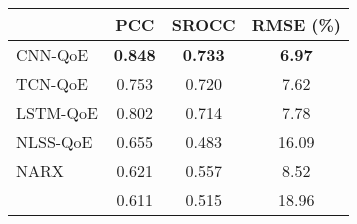 
  \begin{tabular}{|l|c|c|c|}
    \hline
    & PCC & SROCC & RMSE (\%)\\ \hline
    CNN-QoE & \textbf{0.848} & \textbf{0.733} & \textbf{6.97} \\ \hline
    TCN-QoE       & 0.753 & 0.720 & 7.62 \\ \hline
    LSTM-QoE \cite{QoEModel_LSTM}       & 0.802 & 0.714 & 7.78 \\ \hline
    NLSS-QoE \cite{QoEModel_NLSS}        & 0.655 & 0.483 & 16.09 \\ \hline
    NARX \cite{QoEModel_NARX_DynamicNetworks}           & 0.621 & 0.557 & 8.52\\ \hline
    \cite{QoEModel_Wireless} & 0.611 & 0.515 & 18.96 \\ \hline
  \end{tabular}